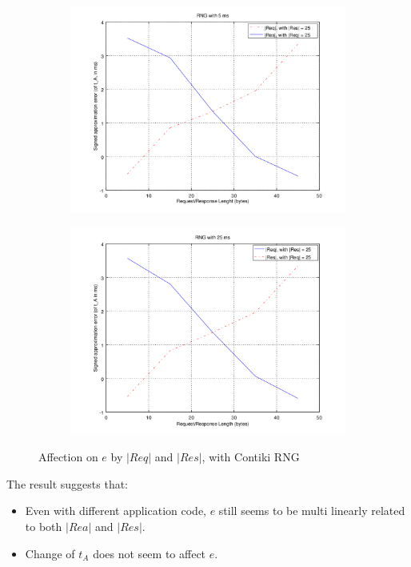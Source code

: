 \begin{figure}[ht!]
	\center
	\begin{subfigure}{0.45\linewidth}
		\center
		\includegraphics[width=\linewidth]{fig/errwithlen5ms.png}
	\end{subfigure}
	\begin{subfigure}{0.45\linewidth}
		\center
		\includegraphics[width=\linewidth]{fig/errwithlen25ms.png}
	\end{subfigure}
	\caption{Affection on $e$ by $|Req|$ and $|Res|$, with Contiki RNG}
	\label{Fig: e by len}
\end{figure}

The result suggests that:
\begin{itemize}
	\item Even with different application code, $e$ still seems to be multi linearly related to both $|Rea|$ and $|Res|$.
	\item Change of $t_A$ does not seem to affect $e$.
\end{itemize}

